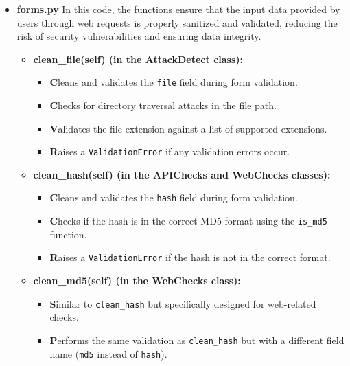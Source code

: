 \documentclass{report}
\begin{document}
\begin{itemize}
    \item \textbf\textbf{forms.py}
    In this code, the functions ensure that the input data provided by users through web requests is properly sanitized and validated, reducing the risk of security vulnerabilities and ensuring data integrity.
        \begin{itemize}
            \item \textbf{clean\_file(self) (in the AttackDetect class):}
            \begin{itemize}
                \item \textbf Cleans and validates the \texttt{file} field during form validation.
                \item \textbf Checks for directory traversal attacks in the file path.
                \item \textbf Validates the file extension against a list of supported extensions.
                \item \textbf Raises a \texttt{ValidationError} if any validation errors occur.
            \end{itemize}
            
            \item \textbf{clean\_hash(self) (in the APIChecks and WebChecks classes):}
            \begin{itemize}
                \item \textbf Cleans and validates the \texttt{hash} field during form validation.
                \item \textbf Checks if the hash is in the correct MD5 format using the \texttt{is\_md5} function.
                \item \textbf Raises a \texttt{ValidationError} if the hash is not in the correct format.
            \end{itemize}
            
            \item \textbf{clean\_md5(self) (in the WebChecks class):}
            \begin{itemize}
                \item \textbf Similar to \texttt{clean\_hash} but specifically designed for web-related checks.
                \item \textbf Performs the same validation as \texttt{clean\_hash} but with a different field name (\texttt{md5} instead of \texttt{hash}).
            \end{itemize}
            

\end{itemize}
\end{itemize}
\end{document}
